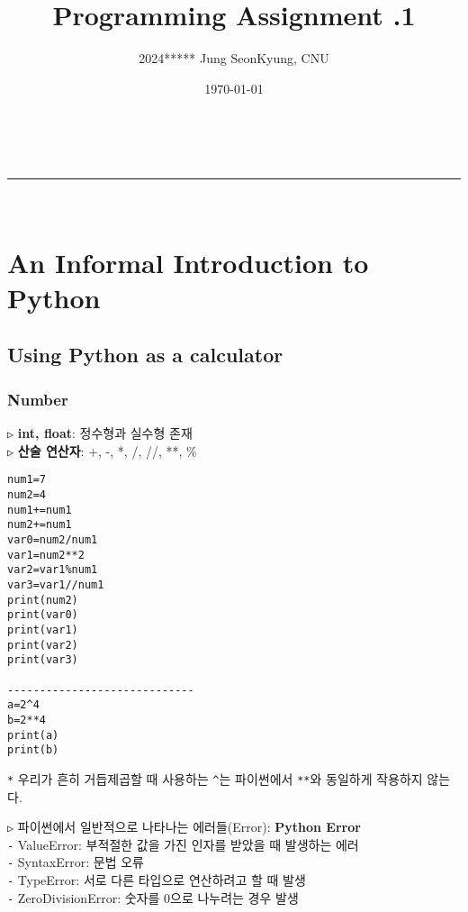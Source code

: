 \documentclass[11pt,a4paper]{article}
\makeatletter
\newcommand{\linia}{\rule{\linewidth}{0.8pt}}
\renewcommand{\maketitle}{
\begin{center}
\vspace{2ex}
{\huge \textsc{\@title}}
\vspace{1ex}
\\
\linia\\
\@author \hfill \@date
\vspace{4ex}
\end{center}
}
\makeatother
\begin{document}
\title{Programming Assignment \textnumero{}.1}

\author{2024***** Jung SeonKyung, CNU}

\date{\today}

\maketitle

\tableofcontents


\section{\LARGE\textbf{An Informal Introduction to Python}}
\subsection{\Large\textbf{Using Python as a calculator}}

\begin{spacing}{1.5}
\subsubsection{\Large\textbf{Number}}
\texttt{▷} \textbf{int, float}: 정수형과 실수형 존재\\
\texttt{▷} \textbf{산술 연산자}: +, -, *, /, //, **, \%\\
\end{spacing}

\begin{lstlisting}[label={list:first},caption=Arithmetic Operators \texttt{\_} 산술연산자]
num1=7
num2=4
num1+=num1
num2+=num1
var0=num2/num1
var1=num2**2
var2=var1%num1
var3=var1//num1
print(num2)
print(var0)
print(var1)
print(var2)
print(var3)

-----------------------------
a=2^4
b=2**4
print(a)
print(b)
\end{lstlisting}
\texttt{*} 우리가 흔히 거듭제곱할 때 사용하는 \texttt{\^}는 파이썬에서 \texttt{**}와 동일하게 작용하지 않는다.\\

\begin{spacing}{1.5}
\texttt{▷} 파이썬에서 일반적으로 나타나는 에러들(Error): \textbf{Python Error}\\
\texttt{-} ValueError: 부적절한 값을 가진 인자를 받았을 때 발생하는 에러\\
\texttt{-} SyntaxError: 문법 오류\\
\texttt{-} TypeError: 서로 다른 타입으로 연산하려고 할 때 발생\\
\texttt{-} ZeroDivisionError: 숫자를 0으로 나누려는 경우 발생\\
\end{spacing}
\end{document}
